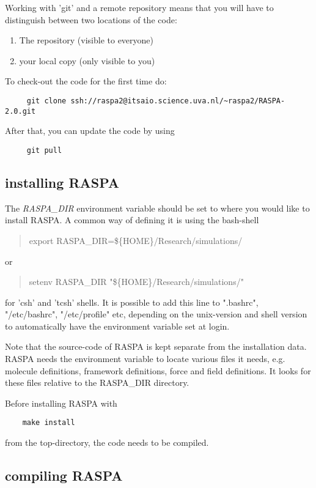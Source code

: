 Working with 'git' and a remote repository  means that you will have to distinguish between two locations of the code:
\begin{enumerate}
 \item{The repository (visible to everyone)}
 \item{your local copy (only visible to you)}
\end{enumerate}

To check-out the code for the first time do:
\begin{verbatim}
     git clone ssh://raspa2@itsaio.science.uva.nl/~raspa2/RASPA-2.0.git
\end{verbatim}
After that, you can update the code by using
\begin{verbatim}
     git pull
\end{verbatim}

\subsection{installing RASPA}

The \emph{RASPA\_DIR} environment variable should be set to where you would like to install RASPA.
A common way of defining it is using the bash-shell
\begin{quote}
  export RASPA\_DIR=\$\{HOME\}/Research/simulations/
\end{quote}
or
\begin{quote}
  setenv RASPA\_DIR "\$\{HOME\}/Research/simulations/"
\end{quote}
for 'csh' and 'tcsh' shells.
It is possible to add this line to ".bashrc", "/etc/bashrc", "/etc/profile" etc, depending on the unix-version and
shell version to automatically have the environment variable set at login.

Note that the source-code of RASPA is kept separate from the installation data. RASPA needs the environment variable to
locate various files it needs, e.g. molecule definitions, framework definitions, force and field definitions.
It looks for these files relative to the RASPA\_DIR directory.

Before installing RASPA with
\begin{verbatim}
    make install
\end{verbatim}
from the top-directory, the code needs to be compiled.

\subsection{compiling RASPA}

